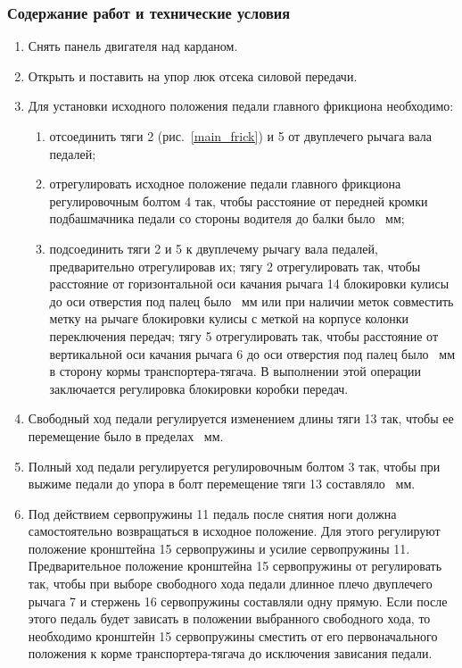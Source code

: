 \subsubsection{Содержание работ и технические условия}
\begin{enumerate}
    \item Снять панель двигателя над карданом. 
    \item Открыть и поставить на упор люк отсека силовой передачи. 
    \item Для установки исходного положения педали главного фрикциона необходимо: 
    \begin{enumerate}
        \item отсоединить тяги 2 (рис.~\ref{main_frick}) и 5 от двуплечего рычага вала педалей; 
        \item отрегулировать исходное положение педали главного фрикциона регулировочным болтом 4 так, чтобы расстояние от передней кромки подбашмачника педали со стороны водителя до балки было ~мм; 
        \item подсоединить тяги 2 и 5 к двуплечему рычагу вала педалей, предварительно отрегулировав их; тягу 2 отрегулировать так, чтобы расстояние от горизонтальной оси качания рычага 14 блокировки кулисы до оси отверстия под палец было ~мм или при наличии меток совместить метку на рычаге блокировки кулисы с меткой на корпусе колонки переключения передач; тягу 5 отрегулировать так, чтобы расстояние от вертикальной оси качания рычага 6 до оси отверстия под палец было ~мм в сторону кормы транспортера-тягача. В выполнении этой операции заключается регулировка блокировки коробки передач. 
    \end{enumerate}
    \item Свободный ход педали регулируется изменением длины тяги 13 так, чтобы ее перемещение было в пределах ~мм. 
    \item Полный ход педали регулируется регулировочным болтом 3 так, чтобы при выжиме педали до упора в болт перемещение тяги 13 составляло ~мм. 
    \item Под действием сервопружины 11 педаль после снятия ноги должна самостоятельно возвращаться в исходное положение. Для этого регулируют положение кронштейна 15 сервопружины и усилие сервопружины 11. Предварительное положение кронштейна 15 сервопружины от регулировать так, чтобы при выборе свободного хода педали длинное плечо двуплечего рычага 7 и стержень 16 сервопружины составляли одну прямую. 
    Если после этого педаль будет зависать в положении выбранного свободного хода, то необходимо кронштейн 15 сервопружины сместить от его первоначального положения к корме транспортера-тягача до исключения зависания педали. 

\end{enumerate}
